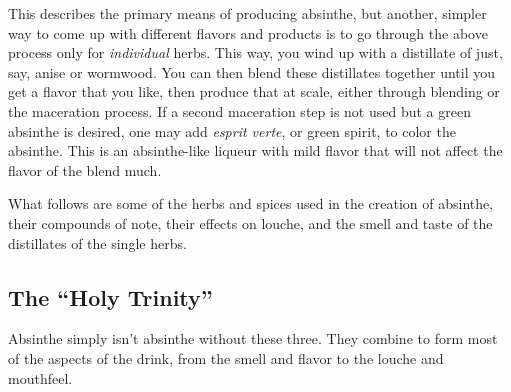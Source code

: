 \documentclass[12pt,letterpaper,oneside]{memoir}
\begin{document}
  This describes the primary means of producing absinthe, but another, simpler way to come up with different flavors and products is to go through the above process only for \textit{individual} herbs.  This way, you wind up with a distillate of just, say, anise or wormwood.  You can then blend these distillates together until you get a flavor that you like, then produce that at scale, either through blending or the maceration process.  If a second maceration step is not used but a green absinthe is desired, one may add \textit{esprit verte}, or green spirit, to color the absinthe.  This is an absinthe-like liqueur with mild flavor that will not affect the flavor of the blend much.

  What follows are some of the herbs and spices used in the creation of absinthe, their compounds of note, their effects on louche, and the smell and taste of the distillates of the single herbs.

  \subsection*{The ``Holy Trinity''}

  Absinthe simply isn't absinthe without these three.  They combine to form most of the aspects of the drink, from the smell and flavor to the louche and mouthfeel.
\end{document}
